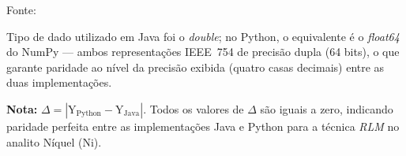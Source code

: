 \begin{table}[H]
\begin{threeparttable}
\begin{center}
\begin{minipage}{0.85\linewidth}
\begin{tablenotes}
\item Fonte:~\oautor
\item[a] Tipo de dado utilizado em Java foi o \textit{double}; no Python,
o equivalente é o \textit{float64} do NumPy — ambos representações IEEE~754
de precisão dupla (64 bits), o que garante paridade ao nível da precisão exibida (quatro casas decimais) entre as
duas implementações.
\item \textbf{Nota:} $\Delta = |\text{Y}_{\text{Python}} - \text{Y}_{\text{Java}}|$.
Todos os valores de $\Delta$ são iguais a zero, indicando paridade
perfeita entre as implementações Java e Python para a técnica \textit{RLM}
no analito Níquel (Ni).
\end{tablenotes}
\end{minipage}
\end{center}
\end{threeparttable}
\end{table}

